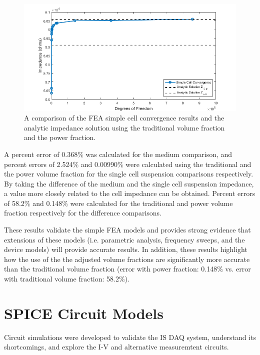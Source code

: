 \begin{figure}[h]
    \centering
    \includegraphics[width=\textwidth]{images/simpleCellValidation.png}
    \caption[Simple Cell validation]{A comparison of the FEA simple cell convergence results and the analytic impedance solution using the traditional volume fraction and the power fraction.}
    \label{fig:simple_cell_validation}
\end{figure}


\par A percent error of 0.368\% was calculated for the medium comparison, and percent errors of 2.524\% and 0.00990\% were calculated using the traditional and the power volume fraction for the single cell suspension comparisons respectively. By taking the difference of the medium and the single cell suspension impedance, a value more closely related to the cell impedance can be obtained. Percent errors of 58.2\% and 0.148\% were calculated for the traditional and power volume fraction respectively for the difference comparisons.

\par These results validate the simple FEA models and provides strong evidence that extensions of these models (i.e. parametric analysis, frequency sweeps, and the device models) will provide accurate results. In addition, these results highlight how the use of the the adjusted volume fractions are significantly more accurate than the traditional volume fraction (error with power fraction: 0.148\% vs. error with traditional volume fraction: 58.2\%). 






\section{SPICE Circuit Models}
\par  Circuit simulations were developed to validate the IS DAQ system, understand its shortcomings, and explore the I-V and alternative measuremtent circuits. 

